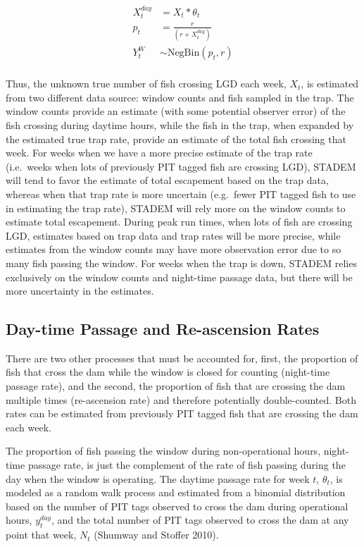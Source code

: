 \documentclass[
  12pt,
]{article}
\begin{document}
\[
\begin{aligned}
  X_t^{day} &= X_t * \theta_t \\
  p_t &= \frac{r}{\left( r + X_t^{day} \right)} \\
  Y^W_t &\sim \text{NegBin} \left( p_t, r \right) \\
\end{aligned}
\]

Thus, the unknown true number of fish crossing LGD each week, \(X_t\), is estimated from two different data source: window counts and fish sampled in the trap. The window counts provide an estimate (with some potential observer error) of the fish crossing during daytime hours, while the fish in the trap, when expanded by the estimated true trap rate, provide an estimate of the total fish crossing that week. For weeks when we have a more precise estimate of the trap rate (i.e.~weeks when lots of previously PIT tagged fish are crossing LGD), STADEM will tend to favor the estimate of total escapement based on the trap data, whereas when that trap rate is more uncertain (e.g.~fewer PIT tagged fish to use in estimating the trap rate), STADEM will rely more on the window counts to estimate total escapement. During peak run times, when lots of fish are crossing LGD, estimates based on trap data and trap rates will be more precise, while estimates from the window counts may have more observation error due to so many fish passing the window. For weeks when the trap is down, STADEM relies exclusively on the window counts and night-time passage data, but there will be more uncertainty in the estimates.

\hypertarget{day-time-passage-and-re-ascension-rates}{%
\subsection{Day-time Passage and Re-ascension Rates}\label{day-time-passage-and-re-ascension-rates}}

There are two other processes that must be accounted for, first, the proportion of fish that cross the dam while the window is closed for counting (night-time passage rate), and the second, the proportion of fish that are crossing the dam multiple times (re-ascension rate) and therefore potentially double-counted. Both rates can be estimated from previously PIT tagged fish that are crossing the dam each week.

The proportion of fish passing the window during non-operational hours, night-time passage rate, is just the complement of the rate of fish passing during the day when the window is operating. The daytime passage rate for week \(t\), \(\theta_t\), is modeled as a random walk process and estimated from a binomial distribution based on the number of PIT tags observed to cross the dam during operational hours, \(y^{day}_t\), and the total number of PIT tags observed to cross the dam at any point that week, \(N_t\) (Shumway and Stoffer 2010).
\end{document}
